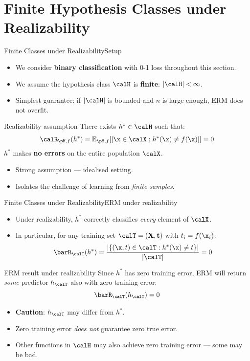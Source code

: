 \section{Finite Hypothesis Classes under Realizability}

\begin{frame}{Finite Classes under Realizability}{Setup}
  \begin{itemize}
    \item We consider \textbf{binary classification} with 0-1 loss throughout this section.
    \item We assume the hypothesis class $\calH$ is \textbf{finite}: $|\calH| < \infty$.
    \item Simplest guarantee: if $|\calH|$ is bounded and $n$ is large enough, ERM does not
          overfit.
  \end{itemize}
  \bigskip
  \begin{block}{Realizability assumption}
    There exists $h^* \in \calH$ such that:
    \[
      \calR_{\pM, f}(h^*) =
      \mathbb{E}_{\pM,f}\!\left[|{\x \in \calX : h^*(\x) \neq f(\x)}|\right] = 0
    \]
    $h^*$ makes \textbf{no errors} on the entire population $\calX$.
  \end{block}
  \begin{itemize}
    \item Strong assumption — idealised setting.
    \item Isolates the challenge of learning from \emph{finite samples}.
  \end{itemize}
\end{frame}

\begin{frame}{Finite Classes under Realizability}{ERM under realizability}
  \begin{itemize}
    \item Under realizability, $h^*$ correctly classifies \emph{every} element of $\calX$.
    \item In particular, for any training set $\calT = (\mathbf{X}, \mathbf{t})$ with
          $t_i = f(\x_i)$:
    \[
      \barR_\calT(h^*) = \frac{|\{(\x,t)\in\calT : h^*(\x) \neq t\}|}{|\calT|} = 0
    \]
  \end{itemize}
  \bigskip
  \begin{block}{ERM result under realizability}
    Since $h^*$ has zero training error, ERM will return \emph{some} predictor
    $h_\calT$ also with zero training error:
    \[
      \barR_\calT(h_\calT) = 0
    \]
  \end{block}
  \begin{itemize}
    \item \textbf{Caution}: $h_\calT$ may differ from $h^*$.
    \item Zero training error \emph{does not} guarantee zero true error.
    \item Other functions in $\calH$ may also achieve zero training error — some may be bad.
  \end{itemize}
\end{frame}

